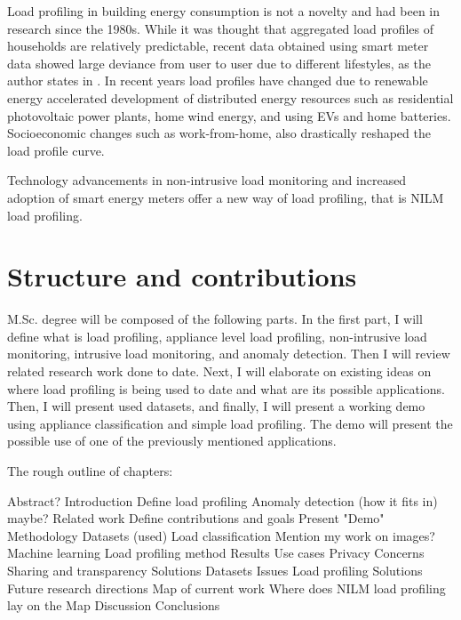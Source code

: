 \documentclass[
11pt, %
english, %
singlespacing, %
headsepline, %
]{MastersDoctoralThesis} %
\begin{document}

Load profiling in building energy consumption is not a novelty and had been in research since the 1980s.
While it was thought that aggregated load profiles of households are relatively predictable, recent data obtained using smart meter data showed large deviance from user to user due to different lifestyles, as the author states in \cite{Review2021}.
In recent years load profiles have changed due to renewable energy accelerated development of distributed energy resources such as residential photovoltaic
power plants, home wind energy, and using EVs and home batteries. Socioeconomic changes such as work-from-home, also drastically reshaped the load profile curve. 


Technology advancements in non-intrusive load monitoring and increased adoption of smart energy meters offer a new
way of load profiling, that is NILM load profiling.


\section{Structure and contributions}
M.Sc. degree will be composed of the following parts. In the first part, I will define what is load profiling, appliance level load profiling, 
non-intrusive load monitoring, intrusive load monitoring, and anomaly detection. Then I will review related research work done to date. Next, I will elaborate 
on existing ideas on where load profiling is being used to date and what are its possible applications. Then, I will present used datasets, and finally,
I will present a working demo using appliance classification and simple load profiling.
The demo will present the possible use of one of the previously mentioned applications. 

The rough outline of chapters: 
\begin{outline}
	\1 Abstract?
	\1 Introduction
	\1 Define load profiling
	\1 Anomaly detection (how it fits in) maybe?
	\1 Related work
	\1 Define contributions and goals
	\1 Present "Demo"
	\1 Methodology
	\2 Datasets (used)
	\2 Load classification
	\3 Mention my work on images?
	\3 Machine learning
	\2 Load profiling method
	\1 Results
	\1 Use cases
	\1 Privacy
	\2 Concerns
	\2 Sharing and transparency
	\2 Solutions
	\1 Datasets
	\2 Issues 
	\2 Load profiling
	\2 Solutions
	\1 Future research directions
	\2 Map of current work
	\2 Where does NILM load profiling lay on the Map
	\1 Discussion
	\1 Conclusions
	
	\end{outline}
\end{document}
